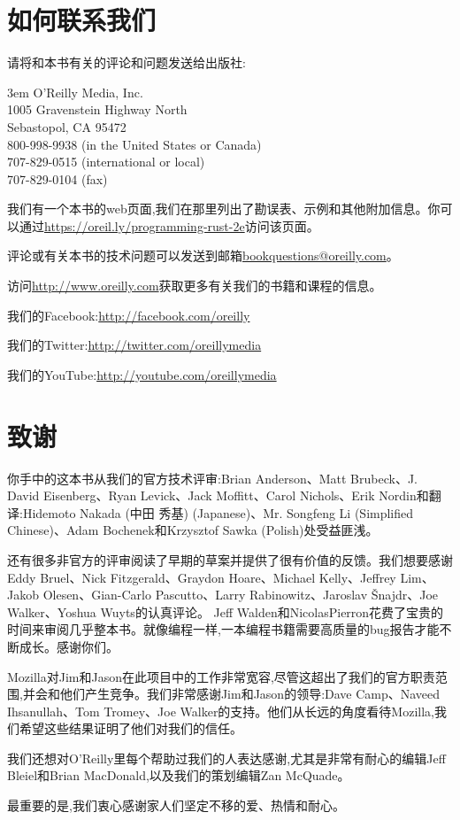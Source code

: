 \section*{如何联系我们}
请将和本书有关的评论和问题发送给出版社:

\hangindent 3em
\noindent
\large{O'Reilly Media, Inc.}\\
\large{1005 Gravenstein Highway North}\\
\large{Sebastopol, CA 95472}\\
\large{800-998-9938 (in the United States or Canada)}\\
\large{707-829-0515 (international or local)}\\
\large{707-829-0104 (fax)}

我们有一个本书的web页面,我们在那里列出了勘误表、示例和其他附加信息。你可以通过\url{https://oreil.ly/programming-rust-2e}访问该页面。

评论或有关本书的技术问题可以发送到邮箱\url{bookquestions@oreilly.com}。

访问\url{http://www.oreilly.com}获取更多有关我们的书籍和课程的信息。

我们的Facebook:\url{http://facebook.com/oreilly}

我们的Twitter:\url{http://twitter.com/oreillymedia}

我们的YouTube:\url{http://youtube.com/oreillymedia}

\section*{致谢}
你手中的这本书从我们的官方技术评审:Brian Anderson、Matt Brubeck、J. David Eisenberg、Ryan Levick、Jack Moffitt、Carol Nichols、Erik Nordin和翻译:Hidemoto Nakada (中田 秀基) (Japanese)、Mr. Songfeng Li (Simplified Chinese)、Adam Bochenek和Krzysztof Sawka (Polish)处受益匪浅。

还有很多非官方的评审阅读了早期的草案并提供了很有价值的反馈。我们想要感谢Eddy Bruel、Nick Fitzgerald、Graydon Hoare、Michael Kelly、Jeffrey Lim、Jakob Olesen、Gian-Carlo Pascutto、Larry Rabinowitz、Jaroslav Šnajdr、Joe Walker、Yoshua Wuyts的认真评论。
Jeff Walden和NicolasPierron花费了宝贵的时间来审阅几乎整本书。就像编程一样,一本编程书籍需要高质量的bug报告才能不断成长。感谢你们。

Mozilla对Jim和Jason在此项目中的工作非常宽容,尽管这超出了我们的官方职责范围,并会和他们产生竞争。我们非常感谢Jim和Jason的领导:Dave Camp、Naveed Ihsanullah、Tom Tromey、Joe Walker的支持。他们从长远的角度看待Mozilla,我们希望这些结果证明了他们对我们的信任。

我们还想对O'Reilly里每个帮助过我们的人表达感谢,尤其是非常有耐心的编辑Jeff Bleiel和Brian MacDonald,以及我们的策划编辑Zan McQuade。

最重要的是,我们衷心感谢家人们坚定不移的爱、热情和耐心。